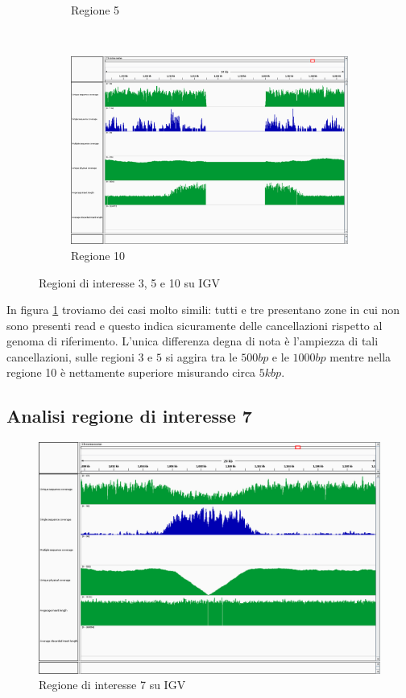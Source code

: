 \begin{figure}[htbp]
\begin{subfigure}[b]{.45\textwidth}
		\caption{Regione 5}
	\end{subfigure}
	\\[1em]
	\begin{subfigure}[b]{.45\textwidth}
		\includegraphics[width=\textwidth]{immagini/igv_regione10.png}
		\caption{Regione 10}
	\end{subfigure}
\caption{Regioni di interesse 3, 5 e 10 su IGV}
\label{fig:regioni 3, 5 e 10}
\end{figure}

In figura \ref{fig:regioni 3, 5 e 10} troviamo dei casi molto simili: tutti e tre presentano zone in cui non sono presenti read e questo indica sicuramente delle cancellazioni rispetto al genoma di riferimento.
L'unica differenza degna di nota è l'ampiezza di tali cancellazioni, sulle regioni $3$ e $5$ si aggira tra le $500bp$ e le $1000bp$ mentre nella regione 10 è nettamente superiore misurando circa $5kbp$.

\subsection{Analisi regione di interesse 7}
\begin{figure}[htbp]
	\centering
	\includegraphics[width=.45\textwidth]{immagini/igv_regione7.png}
	\caption{Regione di interesse 7 su IGV}
	\label{fig:regione 7}
\end{figure}

